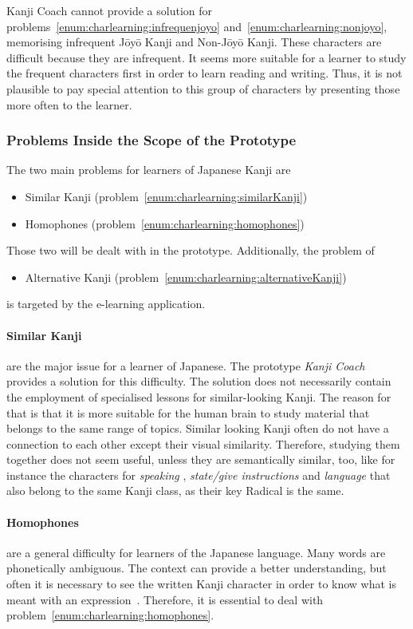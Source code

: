 Kanji Coach cannot provide a solution for 
problems~\ref{enum:charlearning:infrequenjoyo} 
and~\ref{enum:charlearning:nonjoyo}, memorising infrequent Jōyō 
Kanji and Non-Jōyō Kanji. These characters are difficult because they are 
infrequent. It seems more suitable for a learner to study the frequent characters
first in order to learn reading and writing. Thus, it is not plausible to pay 
special attention to this group of characters by presenting those more often to 
the learner.

\subsubsection{Problems Inside the Scope of the Prototype}
\label{sec:concept:problemsinscope}

The two main problems for learners of Japanese Kanji are 
\begin{itemize}
  \item Similar Kanji (problem~\ref{enum:charlearning:similarKanji})
  \item Homophones (problem~\ref{enum:charlearning:homophones})
\end{itemize}
Those two will be dealt with in the prototype. Additionally, the problem of
\begin{itemize}
  \item Alternative Kanji (problem~\ref{enum:charlearning:alternativeKanji})
\end{itemize}
is targeted by the e-learning application.

\paragraph{Similar Kanji} are the major issue for a learner of Japanese. The 
prototype \emph{Kanji Coach} provides a solution for this difficulty.
The solution does not necessarily contain the employment of specialised lessons 
for similar-looking Kanji. The reason for that is that it is more suitable for 
the human brain to study material that belongs to the same range of topics. 
Similar looking Kanji often do not have a connection to each other except their 
visual similarity. Therefore, studying them together does not seem useful,
unless they are semantically similar, too, like for instance the characters for
\emph{speaking} , \emph{state/give instructions}  and 
\emph{language}  that also belong to the same Kanji class, 
as their key Radical is the same.

\paragraph{Homophones} are a general difficulty for learners of the Japanese 
language. Many words are phonetically ambiguous. The context can provide a better
understanding, but often it is necessary to see the written Kanji character in 
order to know what is meant with an expression~.
Therefore, it is essential to deal with 
problem~\ref{enum:charlearning:homophones}. 

